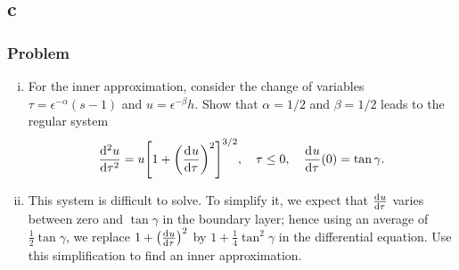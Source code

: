 \documentclass[12pt,twoside]{article}
\begin{document}
\subsection{c}
\label{sec:minilab-part-c}
\subsubsection*{Problem}
\begin{enumerate}[(i)]
\item For the inner approximation, consider the change of variables
  $\tau=\epsilon^{-\alpha}(s-1)$ and $u=\epsilon^{-\beta}h$. Show that
  $\alpha=1/2$ and $\beta=1/2$ leads to the regular system
  \begin{equation}
    \label{eq:minilab-problem-part-c}
    \od[2]{u}{\tau} = u{\left[ 1+{\left( \od{u}{\tau} \right)}^2 \right]}^{3/2},
    \quad \tau\le0,\quad \od{u}{\tau}(0)=\tan\gamma.
  \end{equation}

\item This system is difficult to solve. To simplify it, we expect that
  $\frac{\mathrm{d}^{} {u}}{\mathrm{d}{\tau}^{}}$ varies between zero and $\tan\gamma$ in the boundary layer;
  hence using an average of $\frac{1}{2}\tan\gamma$, we replace
  $1+{\left(\frac{\mathrm{d}^{} {u}}{\mathrm{d}{\tau}^{}}\right)}^2$ by $1+\frac{1}{4}\tan^2\gamma$ in the
  differential equation. Use this simplification to find an inner approximation.
\end{enumerate}
\end{document}
